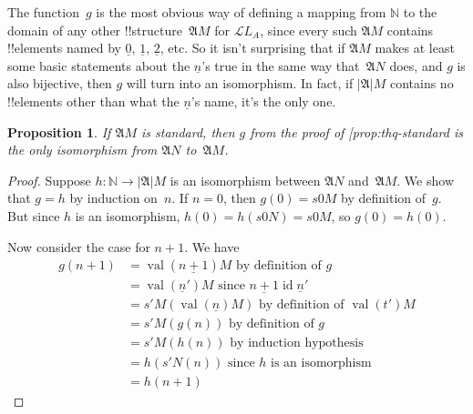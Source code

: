 \documentclass[10pt,a4paper]{article}
\makeatletter
\theoremstyle{plain}
\newtheorem{prop}[thm]{Proposition}
\theoremstyle{definition}
\theoremstyle{remark}
\newenvironment{explain}{}{}
\newcommand*{\ollabel}[1]{\label{#1}}
\newcommand{\olref}{\@ifnextchar[{\olref@i}{\olref@final}}
\def\olref@i[#1]{\@ifnextchar[{\olref@ii}{\olref@final}}
\def\olref@ii[#1]{\@ifnextchar[{\olref@iii}{\olref@final}}
\def\olref@iii[#1]{\olref@final}
\def\olref@final#1{\ref{#1}}
\providecommand{\Obj}{}
\providecommand{\Struct}{\ensuremath{\mathfrak{A}}}
\providecommand{\Domain}{\ensuremath{|\mathfrak{A}|}}
\providecommand{\Assign}{\ensuremath{s}}
\providecommand{\Lang}{\ensuremath{\mathcal{L}}}
\providecommand{\num}[1]{\underline{#1}}
\providecommand{\Nat}{\ensuremath{\mathbb{N}}}
\providecommand{\Value}[1]{\operatorname{val}(#1)}
\providecommand{\ident}{\operatorname{id}}
\makeatother
\begin{document}
\begin{explain}
The function~$g$ is the most obvious way of defining a mapping from
$\Nat$ to the domain of any other !!{structure}~$\Struct{M}$ for
$\Lang{L_A}$, since every such $\Struct{M}$ contains !!{element}s named
by $\num{0}$, $\num{1}$, $\num{2}$, etc. So it isn't surprising that
if $\Struct{M}$ makes at least some basic statements about the
$\num{n}$'s true in the same way that~$\Struct{N}$ does, and $g$ is
also bijective, then $g$ will turn into an isomorphism.  In fact, if
$\Domain{M}$ contains no !!{element}s other than what the $\num{n}$'s
name, it's the only one.
\end{explain}

\begin{prop}
\ollabel{prop:thq-unique-iso} If $\Struct{M}$ is standard, then $g$ from
the proof of \olref{prop:thq-standard} is the only isomorphism from $\Struct{N}$ to~$\Struct{M}$.
\end{prop}

\begin{proof}
Suppose $h\colon \Nat \to \Domain{M}$ is an isomorphism between
$\Struct{N}$ and~$\Struct{M}$. We show that $g = h$ by induction
on~$n$. If $n = 0$, then $g(0) = \Assign{\Obj{0}}{M}$ by definition
of~$g$. But since $h$ is an isomorphism, $h(0) =
h(\Assign{\Obj{0}}{N}) =\Assign{\Obj{0}}{M}$, so $g(0) = h(0)$.

Now consider the case for $n+1$. We have
\begin{align*}
  g(n+1) & = \Value{\num{n+1}}{M} \text{ by definition of~$g$}\\
  & = \Value{\num{n}'}{M} \text{ since $\num{n+1}\ident \num{n}'$}\\
  & = \Assign{\prime}{M}(\Value{\num{n}}{M}) 
    \text{ by definition of $\Value{t'}{M}$}\\
  & = \Assign{\prime}{M}(g(n))  \text{ by definition of~$g$}\\
  & = \Assign{\prime}{M}(h(n)) \text{ by induction hypothesis}\\
  & = h(\Assign{\prime}{N}(n)) \text{ since $h$ is an isomorphism}\\
  & = h(n+1)
\end{align*}
\end{proof}
\end{document}
